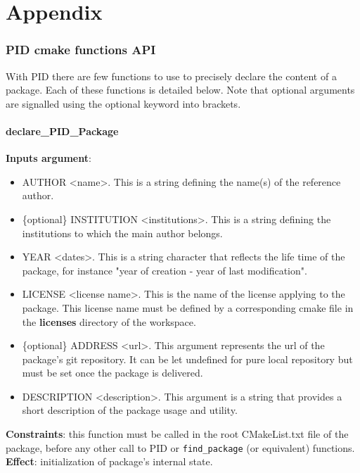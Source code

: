 \documentclass[12pt,a4paper]{article}
\begin{document}
\pagebreak

\part*{Appendix}

\section{PID cmake functions API}
\label{sec:PIDCMakefunctionsAPI}

With PID there are few functions to use to precisely declare the content of a package. Each of these functions is detailed below. Note that optional arguments are signalled using the optional keyword into brackets.

\subsection{declare\_PID\_Package}

\textbf{Inputs argument}: 
\begin{itemize}
\item AUTHOR <name>. This is a string defining the name(s) of the reference author.
\item \{optional\} INSTITUTION <institutions>. This is a string defining the institutions to which the main author belongs.
\item YEAR <dates>. This is a string character that reflects the life time of the package, for instance "year of creation - year of last modification".
\item LICENSE <license name>. This is the name of the license applying to the package. This license name must be defined by a corresponding cmake file in the \textbf{licenses} directory of the workspace.
\item \{optional\} ADDRESS <url>. This argument represents the url of the package's git repository. It can be let undefined for pure local repository but must be set once the package is delivered.
\item DESCRIPTION <description>. This argument is a string that provides a short description of the package usage and utility.
\end{itemize}
\textbf{Constraints}: this function must be called in the root CMakeList.txt file of the package, before any other call to PID or \texttt{find\_package} (or equivalent) functions.\\
\textbf{Effect}: initialization of package's internal state.
\end{document}
